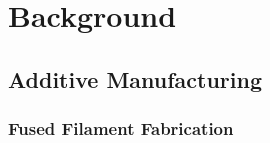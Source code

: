 \documentclass[main.tex]{subfiles}
\begin{document}
\chapter{Background}
\section{Additive Manufacturing}

\subsection{Fused Filament Fabrication}
\end{document}

